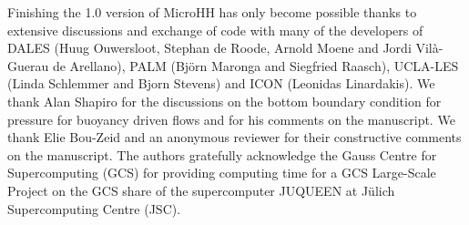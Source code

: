 \documentclass[gmd,manuscript]{copernicus}
\begin{document}
\begin{acknowledgements}
Finishing the 1.0 version of MicroHH has only become possible thanks to extensive discussions and exchange of code with many of the developers of DALES (Huug Ouwersloot, Stephan de Roode, Arnold Moene and Jordi Vil\`{a}-Guerau de Arellano), PALM (Bj\"{o}rn Maronga and Siegfried Raasch), UCLA-LES (Linda Schlemmer and Bjorn Stevens) and ICON (Leonidas Linardakis). We thank Alan Shapiro for the discussions on the bottom boundary condition for pressure for buoyancy driven flows and for his comments on the manuscript. We thank Elie Bou-Zeid and an anonymous reviewer for their constructive comments on the manuscript. The authors gratefully acknowledge the Gauss Centre for Supercomputing (GCS) for providing computing time for a GCS Large-Scale Project on the GCS share of the supercomputer JUQUEEN at J\"{u}lich Supercomputing Centre (JSC). 
\end{acknowledgements}



%
\end{document}
